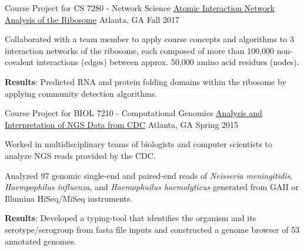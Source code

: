 \begin{cventries}
  \cventry
    {Course Project for CS 7280 - Network Science} %
    {\href{https://nbviewer.jupyter.org/github/NicholasAKovacs/CS7280_Ribosomal_Network_Analysis/blob/master/Jupyter_Notebooks/EsCo_complete_and_SaCe_rPro_analysis/Interaction_Network_Analysis_of_Complete_Ecoli_ribosome_and_Yeast_LSU_rProteins.ipynb}{Atomic Interaction Network Analysis of the Ribosome}} %
    {Atlanta, GA} %
    {Fall 2017} %
    {
      \begin{cvitems} %
      	\item Collaborated with a team member to apply course concepts and algorithms to 3 interaction networks of the ribosome, each composed of more than 100,000 non-covalent interactions (edges) between approx. 50,000 amino acid residues (nodes). 
      	\item {\bf Results}: Predicted RNA and protein folding domains within the ribosome by applying community detection algorithms.
      \end{cvitems}
    }

  \cventry
    {Course Project for BIOL 7210 - Computational Genomics} %
    {\href{http://gbrowse2015.biology.gatech.edu/Home.html}{Analysis and Interpretation of NGS Data from CDC}} %
    {Atlanta, GA} %
    {Spring 2015} %
    {
      \begin{cvitems} %
      	\item Worked in multidisciplinary teams of biologists and computer scientists to analyze NGS reads provided by the CDC.
      	\item Analyzed 97 genomic single-end and paired-end reads of \textit{Neisseria meningitidis}, \textit{Haempophilus influenza}, and \textit{Haemophuilus haemolyticus} generated from GAII or Illumina HiSeq/MiSeq instruments.
      	\item {\bf Results}: Developed a typing-tool that identifies the organism and its serotype/serogroup from fasta file inputs and constructed a genome browser of 53 annotated genomes.
      \end{cvitems}
    }


\end{cventries}
